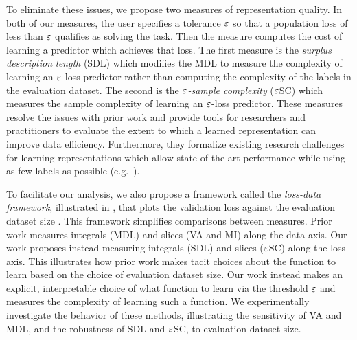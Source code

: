 To eliminate these issues, we propose two measures of representation quality.
In both of our measures, the user specifies a tolerance $\varepsilon$ so that a population loss of less than $\varepsilon$ qualifies as solving the task.
Then the measure computes the cost of learning a predictor which achieves that loss.
The first measure is the \emph{surplus description length} (SDL) which modifies the MDL to measure the complexity of learning an $\varepsilon$-loss predictor rather than computing the complexity of the labels in the evaluation dataset.
The second is the \emph{$\varepsilon$-sample complexity} ($\varepsilon$SC) which measures the sample complexity of learning an $\varepsilon$-loss predictor.
These measures resolve the issues with prior work and provide tools for researchers and practitioners to evaluate the extent to which a learned representation can improve data efficiency.
Furthermore, they formalize existing research challenges for learning representations which allow state of the art performance while using as few labels as possible (e.g.~\citet{Hnaff2020DataEfficientIR}).

To facilitate our analysis, we also propose a framework called the \emph{loss-data framework}, illustrated in , that plots the validation loss against the evaluation dataset size \citep{Talmor2019oLMpics, Yogatama2019LinguisticIntel, Voita2020InformationTheoreticPW}.
This framework simplifies comparisons between measures.
Prior work measures integrals (MDL) and slices (VA and MI) along the data axis.
Our work proposes instead measuring integrals (SDL) and slices ($\varepsilon$SC) along the loss axis.
This illustrates how prior work makes tacit choices about the function to learn based on the choice of evaluation dataset size.
Our work instead makes an explicit, interpretable choice of what function to learn via the threshold $\varepsilon$ and measures the complexity of learning such a function.
We experimentally investigate the behavior of these methods, illustrating the sensitivity of VA and MDL, and the robustness of SDL and $\varepsilon$SC, to evaluation dataset size.

